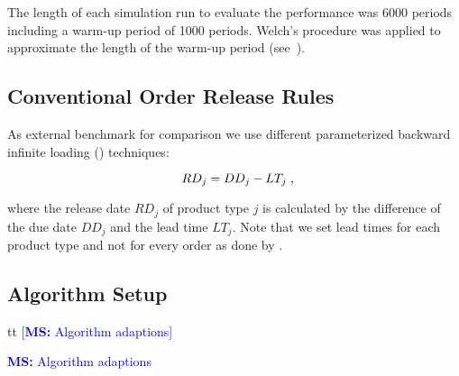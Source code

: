 \documentclass[envcountsame]{llncs}
\newcommand\MS[2][r]{\ifx t#1 \textcolor{blue}{[\textbf{MS:} #2]}
  \else \begin{center}\textcolor{blue}{\textbf{MS:} #2} \end{center} \fi}
\begin{document}
The length of each simulation run to evaluate the performance was 6000 periods including a warm-up
period of 1000 periods. Welch’s procedure was applied to approximate the length of the warm-up
period (see~\citealt{law:simulationc}).



\subsection{Conventional Order Release Rules}

As external benchmark for comparison we use
different parameterized backward infinite loading (\BIL{}) techniques:

\begin{equation*}
  RD_{j} = DD_{j} - LT_{j} \tcom
  \label{eq:BIL}
\end{equation*}

where the release date \(RD_{j}\) of product type \(j\) is calculated by the difference of the due
date \(DD_{j}\) and the lead time \(LT_{j}\). Note that we set lead times for each product type and
not for every order as done by \cite{Ackerman1963}.




\subsection{Algorithm Setup}
\label{subsec:Algorithm_Setup}

\MS[t]{Algorithm adaptions}
\end{document}
